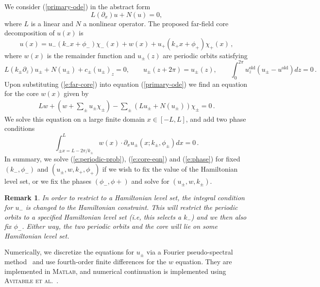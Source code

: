 \documentclass[10pt]{article}
\newtheorem{rmk}[thm]{Remark}
\begin{document}
We consider (\ref{primary-ode}) in the abstract form
\begin{equation}
L(\partial_x)u + N(u) = 0,
\end{equation}
where $L$ is a linear and $N$ a nonlinear operator.  The proposed far-field core decomposition of $u(x)$ is
%
\begin{equation}\label{e:far-core}
u(x) = u_-(k_-x + \phi_-)\chi_-(x) + w(x) + u_+(k_+x+\phi_+)\chi_+(x)\,,
\end{equation}
where $w(x)$ is the remainder function and $u_\pm(z)$ are periodic orbits satisfying
\begin{equation}\label{e:periodic-prob}
L(k_\pm\partial_z)u_\pm + N(u_\pm) + c_\pm (u_\pm)_z= 0,\qquad u_{\pm}(z+2\pi) = u_\pm(z),\qquad \int_0^{2\pi}u^{\mbox{old}}_z(u_\pm-u^{\mbox{old}})dz = 0\,.
\end{equation}
Upon substituting (\ref{e:far-core}) into equation (\ref{primary-ode}) we find
an equation for the core $w(x)$ given by
\begin{align}\label{e:core-eqn}
Lw + \left(w+\sum_{\pm}u_\pm\chi_\pm \right) - \sum_{\pm}\left(Lu_{\pm} + N(u_\pm) \right)\chi_\pm = 0\,.
\end{align}
We solve this equation on a large finite domain $x\in[-L,L]$, and add two phase conditions 
\begin{equation}\label{e:phase}
\int^{L}_{\pm x = L - 2\pi/k_\pm}w(x) \cdot \partial_x u_{\pm}(x;k_{\pm},\phi_\pm)dx = 0\,.
\end{equation}
In summary, we solve (\ref{e:periodic-prob}), (\ref{e:core-eqn}) and (\ref{e:phase}) for fixed $(k_-,\phi_-)$ and $(u_{\pm},w,k_+,\phi_+)$ if we wish to fix the value of the Hamiltonian level set, or we fix the phases $(\phi_-,\phi+)$ and solve for $(u_{\pm},w,k_\pm)$. 

\begin{rmk} In order to restrict to a Hamiltonian level set, the
integral condition for $u_-$ is changed to the Hamiltonian constraint. This will
restrict the periodic orbits to a specified Hamiltonian level set (i.e, this
selects a $k_-$) and we then also fix $\phi_-$. Either way, the two periodic orbits and the core will lie on \emph{some} Hamiltonian level set.
\end{rmk}

Numerically, we discretize the
equations for $u_\pm$ via a Fourier pseudo-spectral method~\cite{Trefethen2000}
and use fourth-order finite differences for the $w$ equation. They are implemented in \textsc{Matlab}, and numerical continuation is implemented using \textsc{Avitabile et al.}~\cite{Avitabile2020}. 
\end{document}
